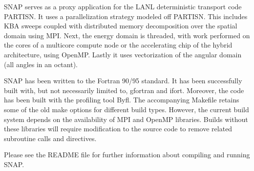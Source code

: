 S\-N\-A\-P serves as a proxy application for the L\-A\-N\-L deterministic transport code P\-A\-R\-T\-I\-S\-N. It uses a parallelization strategy modeled off P\-A\-R\-T\-I\-S\-N. This includes K\-B\-A sweeps coupled with distributed memory decomposition over the spatial domain using M\-P\-I. Next, the energy domain is threaded, with work performed on the cores of a multicore compute node or the accelerating chip of the hybrid architecture, using Open\-M\-P. Lastly it uses vectorization of the angular domain (all angles in an octant).

S\-N\-A\-P has been written to the Fortran 90/95 standard. It has been successfully built with, but not necessarily limited to, gfortran and ifort. Moreover, the code has been built with the profiling tool Byfl. The accompanying Makefile retains some of the old make options for different build types. However, the current build system depends on the availability of M\-P\-I and Open\-M\-P libraries. Builds without these libraries will require modification to the source code to remove related subroutine calls and directives.

Please see the R\-E\-A\-D\-M\-E file for further information about compiling and running S\-N\-A\-P. 